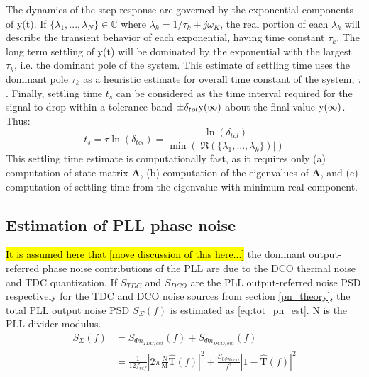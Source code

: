 
	The dynamics of the step response are governed by the exponential components of y(t). If  $\{\lambda_1, ... , \lambda_N\} \in \mathds{C}$ where $\lambda_k=1/\tau_k+j\omega_K$, the real portion of each $\lambda_k$ will describe the transient behavior of each exponential, having time constant $\tau_k$. The long term settling of y(t) will be dominated by the exponential with the largest $\tau_k$, i.e. the dominant pole of the system. This estimate of settling time uses the dominant pole $\tau_k$ as a heuristic estimate for overall time constant of the system, $\tau$. Finally, settling time $t_s$ can be considered as the time interval required for the signal to drop within a tolerance band $\pm \delta_{tol} \textnormal{y}(\infty)$ about the final value $\textnormal{y}(\infty)$. Thus:
	\begin{equation}
		t_s = \tau\ln(\delta_{tol}) = \frac{\ln(\delta_{tol})}{\min(|\Re(\{\lambda_1, ... , \lambda_k\})|)}
	\end{equation}
	This settling time estimate is computationally fast, as it requires only (a) computation of state matrix $\mathbf{A}$, (b) computation of the eigenvalues of $\mathbf{A}$, and (c) computation of settling time from the eigenvalue with minimum real component.

\subsection{Estimation of PLL phase noise}
	\hl{It is assumed here that [move discussion of this here...]} the dominant output-referred phase noise contributions of the PLL are due to the DCO thermal noise and TDC quantization. If $S_{TDC}$ and $S_{DCO}$ are the PLL output-referred noise PSD respectively for the TDC and DCO noise sources from section \ref{pn_theory}, the total PLL output noise PSD $S_{\Sigma}(f)$ is estimated as \ref{eq:tot_pn_est}. N is the PLL divider modulus.
	\begin{align}\label{eq:tot_pn_est}
		S_{\Sigma}(f) &= S_{\Phi n_{TDC,out}}(f) + S_{\Phi n_{DCO,out}}(f)\\
		 &= \frac{1}{12f_{ref}}\left|2\pi\frac{\mathrm{N}}{\mathrm{M}}\hat{\mathrm{T}}(f)\right|^2 + \frac{S_{0\Phi n_{DCO}}}{f^2}\left|1-\hat{\mathrm{T}}(f)\right|^2
	\end{align}

